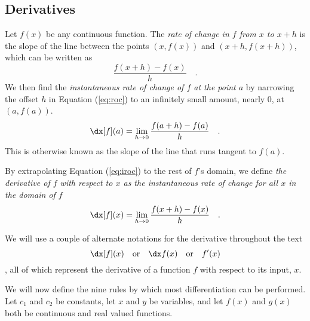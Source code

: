 \subsection{Derivatives}

Let $f(x)$ be any continuous function. The \emph{rate of change in $f$ from $x$ to $x+h$} is the slope of the line between
the points $(x, f(x))$ and $(x + h, f(x+h))$, which can be written as
\begin{equation}\label{eq:roc}
    \frac{f(x+h)-f(x)}{h} \quad .
\end{equation}
We then find the \emph{instantaneous rate of change of $f$ at the point $a$} by
narrowing the offset $h$ in Equation (\ref{eq:roc}) to an infinitely small
amount, nearly 0, at $(a, f(a))$.
\begin{equation}\label{eq:iroc}
    \dx[f] (a) = \lim_{h\rightarrow 0} \frac{f(a + h) - f(a)}{h} \quad .
\end{equation}
This is otherwise known as the slope of the line that runs tangent to $f(a)$.

By extrapolating Equation (\ref{eq:iroc}) to the rest of $f$'s domain, we define \emph{the derivative of $f$ with respect to $x$ as the
instantaneous rate of change for all $x$ in the domain of $f$}
\begin{equation}\label{eq:derivative}
    \dx[f] (x) = \lim_{h\rightarrow 0} \frac{f(x + h) - f(x)}{h} \quad .
\end{equation}

We will use a couple of alternate notations for the derivative
throughout the text
\begin{equation*}
    \dx[f](x) \quad \text{or} \quad \dx f(x) \quad \text{or} \quad f'(x)
\end{equation*}, all of which represent the derivative of a function $f$ with respect to its input, $x$.



We will now define the nine rules by which most differentiation can be performed. Let $c_1$ and $c_2$ be constants, let $x$ and $y$ be variables, and let $f(x)$ and $g(x)$ both be continuous and real valued functions.

